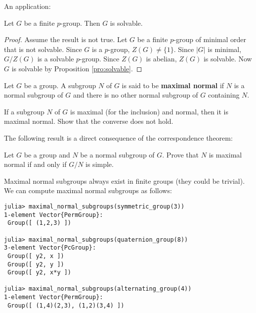 An application:

\begin{proposition}
    Let $G$ be a finite $p$-group. Then $G$ is solvable. 
\end{proposition}

\begin{proof}
    Assume the result is not true. Let $G$ be a finite
    $p$-group of minimal order that is not solvable. Since 
    $G$ is a $p$-group, $Z(G)\ne\{1\}$. Since $|G|$ is minimal, 
    $G/Z(G)$ is a solvable $p$-group. Since $Z(G)$ is abelian, 
    $Z(G)$ is solvable. Now $G$ is solvable 
    by Proposition \ref{pro:solvable}.
\end{proof}

Let $G$ be a group. A subgroup $N$ of $G$ is said to be \textbf{maximal normal} 
if $N$ is a normal subgroup of $G$ and there is no other normal subgroup of $G$ 
containing $N$. 

\begin{exercise}
    If a subgroup $N$ of $G$ is maximal (for the inclusion) and
    normal, then it is maximal normal. Show that the converse does not hold.
\end{exercise}


The following result is a direct consequence of the correspondence theorem:

\begin{exercise}
\label{xca:G/N_simple}
    Let $G$ be a group and $N$ be a normal subgroup of $G$. Prove that 
    $N$ is maximal normal if and only if $G/N$ is simple. 
\end{exercise}

Maximal normal subgroups always exist in finite groups (they could be trivial). 
We can compute maximal normal subgroups as follows:
\begin{lstlisting}
julia> maximal_normal_subgroups(symmetric_group(3))
1-element Vector{PermGroup}:
 Group([ (1,2,3) ])

julia> maximal_normal_subgroups(quaternion_group(8))
3-element Vector{PcGroup}:
 Group([ y2, x ])
 Group([ y2, y ])
 Group([ y2, x*y ])

julia> maximal_normal_subgroups(alternating_group(4))
1-element Vector{PermGroup}:
 Group([ (1,4)(2,3), (1,2)(3,4) ])    
\end{lstlisting}

